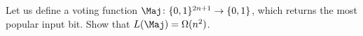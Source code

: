 Let us define a voting function $\Maj\colon \{0, 1\}^{2n + 1} \to \{0, 1\}$, which returns the most
popular input bit. Show that $L(\Maj) = \Omega(n^2)$.
